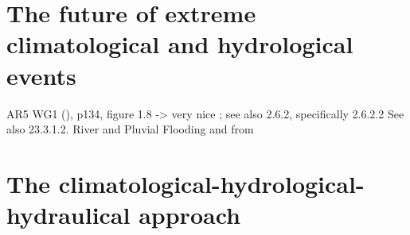 \section{The future of extreme climatological and hydrological events}
AR5 WG1 (\cite{IPCC2013}), p134, figure 1.8 -> very nice ; see also 2.6.2, specifically 2.6.2.2
See also 23.3.1.2. River and Pluvial Flooding and from \cite{Aalst2014}


\section{The climatological-hydrological-hydraulical approach}
